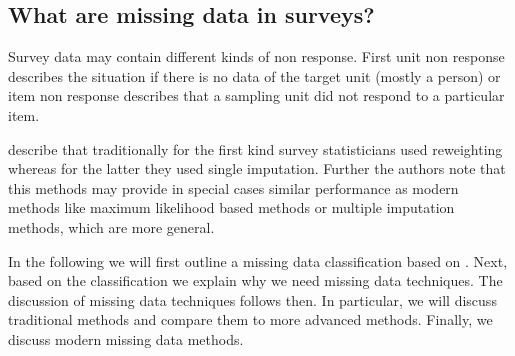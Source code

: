 \subsection{What are missing data in surveys?}

Survey data may contain different kinds of non response. First unit non response describes the situation if there is no data of the target unit (mostly a person) or item non response describes that a sampling unit did not respond to a particular item. \par

\cite{schafer2002missing} describe that traditionally for the first kind survey statisticians used reweighting whereas for the latter they used single imputation.
Further the authors note that this methods may provide in special cases similar performance as modern methods like maximum likelihood based methods or multiple imputation methods, which are more general. \par

In the following we will first outline a missing data classification based on \cite{rubin1976}. 
Next, based on the classification we explain why we need missing data techniques. 
The discussion of missing data techniques follows then. In particular, we will discuss traditional methods and compare them to more advanced methods. 
Finally, we discuss modern missing data methods. \par

